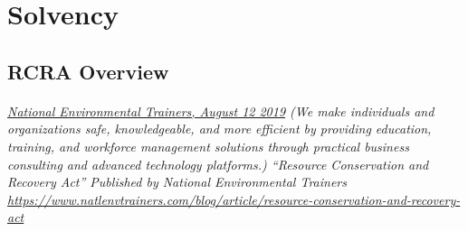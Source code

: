 \documentclass{article}
\begin{document}
\section{Solvency}

\subsection{RCRA Overview}
\paragraph{}
\small
\textit{
\underline{National Environmental Trainers, August 12 2019}
(We make individuals and organizations safe, knowledgeable, and more efficient by providing education, training, and workforce management solutions through practical business consulting and advanced technology platforms.) “Resource Conservation and Recovery Act” Published by National Environmental Trainers 
\url{https://www.natlenvtrainers.com/blog/article/resource-conservation-and-recovery-act}}
\normalsize
\end{document}
